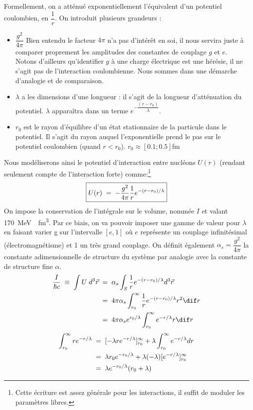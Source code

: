 Formellement, on a atténué exponentiellement l'équivalent d'un potentiel coulombien, en $\dfrac{1}{r}$. On introduit plusieurs grandeurs :
\begin{itemize}[label = $\bullet$]
    \item $\dfrac{g^2}{4\pi}$ Bien entendu le facteur $4\pi$ n'a pas d'intérêt en soi, il nous servira juste à comparer proprement les amplitudes des constantes de couplage $g$ et $e$. Notons d'ailleurs qu'identifier $g$ à une charge électrique est une hérésie, il ne s'agit pas de l'interaction coulombienne. Nous sommes dans une démarche d'analogie et de comparaison.
    \item $\lambda$ a les dimensions d'une longueur : il s'agit de la longueur d'atténuation du potentiel. $\lambda$ apparaîtra dans un terme $e^{-\dfrac{(r-r_0)}{\lambda}}$.
    \item $r_0$ est le rayon d'équilibre d'un état stationnaire de la particule dans le potentiel. Il s'agit du rayon auquel l'exponentielle prend le pas sur le potentiel coulombien (quand $r<r_0$). $r_0 \approx [0.1;0.5]$\si{fm}
\end{itemize}
Nous modéliserons ainsi le potentiel d'interaction entre nucléons $U(r)$ (rendant seulement compte de l'interaction forte) comme:\footnote{Cette écriture est assez générale pour les interactions, il suffit de moduler les paramètres libres.}
\[
\boxed{
    U(r) \; = \; -\dfrac{g^2}{4\pi} \dfrac{1}{r}e^{-(r-r_0)/\lambda}
    }
\]
On impose la conservation de l'intégrale sur le volume, nommée $I$ et valant \SI{170}{MeV \cdot fm^3}. Par ce biais, on va pouvoir imposer une gamme de valeur pour $\lambda$ en faisant varier g sur l'intervalle $[e,1]$ où $e$ représente un couplage infinitésimal (électromagnétisme) et 1 un très grand couplage. On définit également $\alpha_s = \dfrac{g^2}{4\pi}$ la constante adimensionnelle de structure du système par analogie avec la constante de structure fine $\alpha$.
\begin{align*}
    \dfrac{I}{\hbar c}  
    \;\equiv\; \int U \; d^3\Vec{r}
    &\eq \alpha_s \int_S \dfrac{1}{r}e^{-(r-r_0)/\lambda} d^3\Vec{r}\\
    &\eq 4\pi \alpha_s \int_{r_0}^\infty \dfrac{1}{r}e^{-(r-r_0)/\lambda} r^2 \dif r\\
    &\eq 4\pi\alpha_s e^{r_0/\lambda} \int_{r_0}^\infty e^{-r/\lambda} r \dif r
\end{align*}
\begin{align*}
    \int_{r_0}^\infty re^{-r/\lambda} &\; = \; [-\lambda r e^{-r/\lambda}]_{r_0}^\infty + \lambda\int_{r_0}^\infty e^{-r/\lambda}dr\\
    &\; = \; \lambda r_0 e^{-r_0/\lambda} + \lambda (-\lambda)[e^{-r/\lambda}]_{r_0}^\infty\\
    &\; = \; \lambda e^{-r_0/\lambda}(r_0 + \lambda)
\end{align*}
